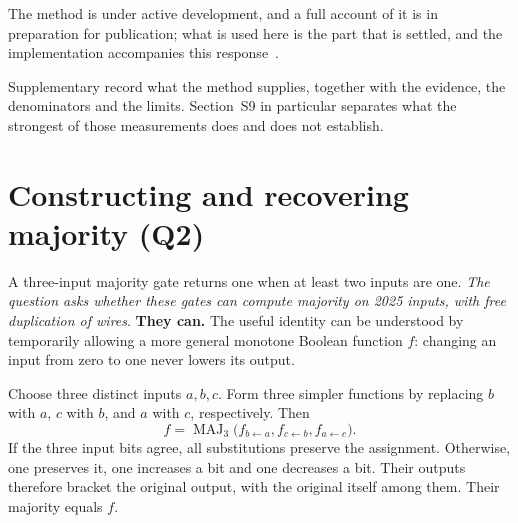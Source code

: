 \documentclass[11pt,a4paper]{article}
\newcommand{\Maj}{\operatorname{MAJ}_3}
\begin{document}
The method is under active development, and a full account of it is in
preparation for publication; what is used here is the part that is settled, and
the implementation accompanies this response~\cite{causalbool}.


Supplementary record  what the method
supplies, together with the evidence, the denominators and the limits.
Section~S9 in particular separates what the strongest of those measurements
does and does not establish.


\section{Constructing and recovering majority (Q2)}
A three-input majority gate returns one when at least two inputs are one.
\textit{The question asks whether these gates can compute majority on 2025 inputs,
with free duplication of wires}. \textbf{They can.} The useful identity can be
understood by temporarily allowing a more general monotone Boolean function
$f$: changing an input from zero to one never lowers its output.

Choose three distinct inputs $a,b,c$. Form three simpler functions by
replacing $b$ with $a$, $c$ with $b$, and $a$ with $c$, respectively. Then
\begin{equation}\label{eq:maj}
f=\Maj\bigl(f_{b\gets a},f_{c\gets b},f_{a\gets c}\bigr).
\end{equation}
If the three input bits agree, all substitutions preserve the assignment.
Otherwise, one preserves it, one increases a bit and one decreases a bit.
Their outputs therefore bracket the original output, with the original
itself among them. Their majority equals $f$.
\end{document}
